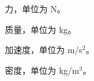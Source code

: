 \begin{symbols}
  \item[$F$] 力，单位为 N。
  \item[$m$] 质量，单位为 kg。
  \item[$a$] 加速度，单位为 m/s$^2$。
  \item[$\rho$] 密度，单位为 kg/m$^3$。
\end{symbols}
